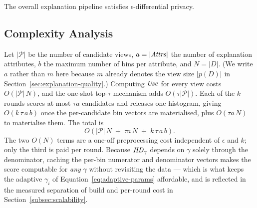 \begin{corollary}
\label{cor:end-to-end-dp}
The overall explanation pipeline satisfies $\epsilon$-differential privacy.
\end{corollary}

\subsection{Complexity Analysis}
\label{subsec:complexity-analysis}

Let $|\mathcal{P}|$ be the number of candidate views, $a=|\mathit{Attrs}|$ the number of explanation attributes, $b$ the maximum number of bins per attribute, and $N=|D|$.
(We write $a$ rather than $m$ here because $m$ already denotes the view size $|p(D)|$ in Section~\ref{sec:explanation-quality}.)
Computing $\mathit{Use}$ for every view costs $O(|\mathcal{P}|\,N)$, and the one-shot top-$\tau$ mechanism adds $O(\tau|\mathcal{P}|)$.
Each of the $k$ rounds scores at most $\tau a$ candidates and releases one histogram, giving $O(k\,\tau\,a\,b)$ once the per-candidate bin vectors are materialised, plus $O(\tau a\, N)$ to materialise them.
The total is
\[
O\!\left(|\mathcal{P}|\,N \;+\; \tau a\, N \;+\; k\,\tau\,a\,b\right).
\]
The two $O(N)$ terms are a one-off preprocessing cost independent of $\epsilon$ and $k$; only the third is paid per round.
Because $\mathit{HD}_\gamma$ depends on $\gamma$ solely through the denominator, caching the per-bin numerator and denominator vectors makes the score computable for \emph{any} $\gamma$ without revisiting the data --- which is what keeps the adaptive $\gamma_i$ of Equation~\eqref{eq:adaptive-params} affordable, and is reflected in the measured separation of build and per-round cost in Section~\ref{subsec:scalability}.
